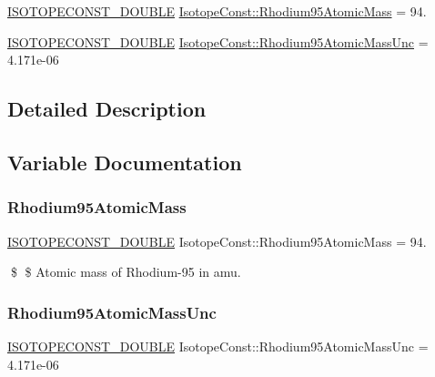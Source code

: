 \begin{DoxyCompactItemize}
\item 
\mbox{\hyperlink{group___isotope_const-_macros_ga8f45a7272ce02c0b4c65c44636ed719a}{I\+S\+O\+T\+O\+P\+E\+C\+O\+N\+S\+T\+\_\+\+D\+O\+U\+B\+LE}} \mbox{\hyperlink{group___isotope_const-_rhodium-_rh95_ga9ef19aaa01ba9380e65aa58c31923514}{Isotope\+Const\+::\+Rhodium95\+Atomic\+Mass}} = 94.
\item 
\mbox{\hyperlink{group___isotope_const-_macros_ga8f45a7272ce02c0b4c65c44636ed719a}{I\+S\+O\+T\+O\+P\+E\+C\+O\+N\+S\+T\+\_\+\+D\+O\+U\+B\+LE}} \mbox{\hyperlink{group___isotope_const-_rhodium-_rh95_ga8ba55f76a75b7c538af5c096a2d8c138}{Isotope\+Const\+::\+Rhodium95\+Atomic\+Mass\+Unc}} = 4.\+171e-\/06
\end{DoxyCompactItemize}


\subsection{Detailed Description}


\subsection{Variable Documentation}
\mbox{\label{group___isotope_const-_rhodium-_rh95_ga9ef19aaa01ba9380e65aa58c31923514}} 
\subsubsection{\texorpdfstring{Rhodium95\+Atomic\+Mass}{Rhodium95AtomicMass}}
{\footnotesize\ttfamily \mbox{\hyperlink{group___isotope_const-_macros_ga8f45a7272ce02c0b4c65c44636ed719a}{I\+S\+O\+T\+O\+P\+E\+C\+O\+N\+S\+T\+\_\+\+D\+O\+U\+B\+LE}} Isotope\+Const\+::\+Rhodium95\+Atomic\+Mass = 94.}

\$ \$ Atomic mass of Rhodium-\/95 in amu. \mbox{\label{group___isotope_const-_rhodium-_rh95_ga8ba55f76a75b7c538af5c096a2d8c138}} 
\subsubsection{\texorpdfstring{Rhodium95\+Atomic\+Mass\+Unc}{Rhodium95AtomicMassUnc}}
{\footnotesize\ttfamily \mbox{\hyperlink{group___isotope_const-_macros_ga8f45a7272ce02c0b4c65c44636ed719a}{I\+S\+O\+T\+O\+P\+E\+C\+O\+N\+S\+T\+\_\+\+D\+O\+U\+B\+LE}} Isotope\+Const\+::\+Rhodium95\+Atomic\+Mass\+Unc = 4.\+171e-\/06}

